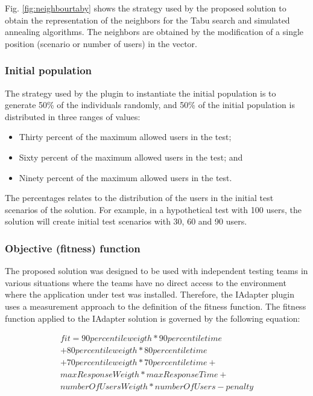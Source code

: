 Fig. \ref{fig:neighbourtaby} shows the strategy used by the proposed solution to obtain the representation of the neighbors for the Tabu search and simulated annealing algorithms. The neighbors are obtained by the modification of a single position (scenario or number of users) in the vector.





\subsubsection{Initial population}

The strategy used by the plugin to instantiate the initial population is to generate 50\% of the individuals randomly, and 50\% of the initial population is distributed in three ranges of values:

\begin{itemize}
\item Thirty percent of the maximum allowed users in the test;
\item Sixty percent of the maximum allowed users in the test; and
\item Ninety percent of the maximum allowed users in the test.
\end{itemize}

The percentages relates to the distribution of the users in the initial test scenarios of the solution. For example, in a hypothetical test with 100 users, the solution will create initial test scenarios with 30, 60 and 90 users.

\subsubsection{Objective (fitness) function}

The proposed solution was designed to be used with independent testing teams in various situations where the teams have no direct access to the environment where the application under test was installed. Therefore, the IAdapter plugin uses a measurement approach to the definition of the fitness function. The fitness function applied to the IAdapter solution is governed by the following equation:

\begin{equation}
\begin{aligned}
fit=90percentileweigth* 90percentiletime\\
+80percentileweigth*80percentiletime\\+
70percentileweigth*70percentiletime+\\
maxResponseWeigth*maxResponseTime+\\
numberOfUsersWeigth*numberOfUsers-penalty
\end{aligned}
\end{equation}

